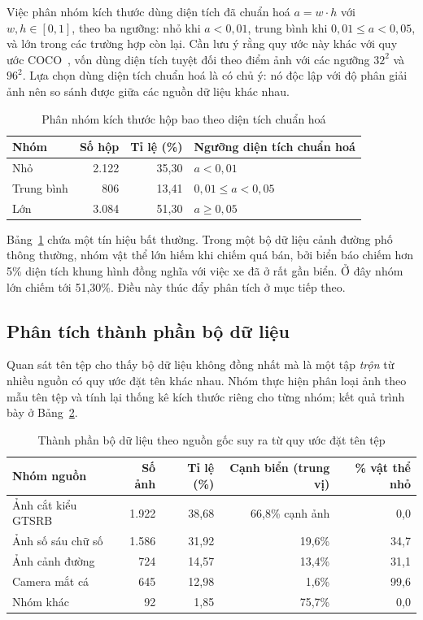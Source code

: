 Việc phân nhóm kích thước dùng diện tích đã chuẩn hoá $a = w \cdot h$ với $w, h \in [0,1]$, theo
ba ngưỡng: nhỏ khi $a < 0{,}01$, trung bình khi $0{,}01 \le a < 0{,}05$, và lớn trong các trường
hợp còn lại. Cần lưu ý rằng quy ước này khác với quy ước COCO~\cite{lin2014coco}, vốn dùng diện
tích tuyệt đối theo điểm ảnh với các ngưỡng $32^2$ và $96^2$. Lựa chọn dùng diện tích chuẩn hoá là
có chủ ý: nó độc lập với độ phân giải ảnh nên so sánh được giữa các nguồn dữ liệu khác nhau.

\begin{table}[H]
\centering
\caption{Phân nhóm kích thước hộp bao theo diện tích chuẩn hoá}
\label{tab:bbox_cat}
\small
\begin{tabular}{lrrl}
\toprule
\textbf{Nhóm} & \textbf{Số hộp} & \textbf{Tỉ lệ (\%)} & \textbf{Ngưỡng diện tích chuẩn hoá} \\
\midrule
Nhỏ        & 2.122 & 35,30 & $a < 0{,}01$ \\
Trung bình & 806   & 13,41 & $0{,}01 \le a < 0{,}05$ \\
Lớn        & 3.084 & 51,30 & $a \ge 0{,}05$ \\
\bottomrule
\end{tabular}
\end{table}

Bảng~\ref{tab:bbox_cat} chứa một tín hiệu bất thường. Trong một bộ dữ liệu cảnh đường phố thông
thường, nhóm vật thể lớn hiếm khi chiếm quá bán, bởi biển báo chiếm hơn 5\% diện tích khung hình
đồng nghĩa với việc xe đã ở rất gần biển. Ở đây nhóm lớn chiếm tới 51,30\%. Điều này thúc đẩy phân
tích ở mục tiếp theo.

\subsection{Phân tích thành phần bộ dữ liệu}
\label{sec:thanhphan}

Quan sát tên tệp cho thấy bộ dữ liệu không đồng nhất mà là một tập \emph{trộn} từ nhiều nguồn có
quy ước đặt tên khác nhau. Nhóm thực hiện phân loại ảnh theo mẫu tên tệp và tính lại thống kê kích
thước riêng cho từng nhóm; kết quả trình bày ở Bảng~\ref{tab:thanhphan}.

\begin{table}[H]
\centering
\caption{Thành phần bộ dữ liệu theo nguồn gốc suy ra từ quy ước đặt tên tệp}
\label{tab:thanhphan}
\small
\begin{tabular}{lrrrr}
\toprule
\textbf{Nhóm nguồn} & \textbf{Số ảnh} & \textbf{Tỉ lệ (\%)} & \textbf{Cạnh biển (trung vị)} & \textbf{\% vật thể nhỏ} \\
\midrule
Ảnh cắt kiểu GTSRB & 1.922 & 38,68 & 66,8\% cạnh ảnh & 0,0 \\
Ảnh số sáu chữ số  & 1.586 & 31,92 & 19,6\%          & 34,7 \\
Ảnh cảnh đường     & 724   & 14,57 & 13,4\%          & 31,1 \\
Camera mắt cá      & 645   & 12,98 & 1,6\%           & 99,6 \\
Nhóm khác          & 92    & 1,85  & 75,7\%          & 0,0 \\
\bottomrule
\end{tabular}
\end{table}

